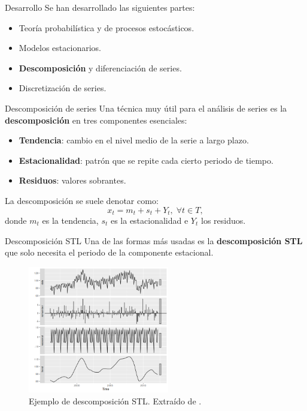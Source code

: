 \documentclass[spanish]{beamer}
\begin{document}
\begin{frame}{Desarrollo}
  Se han desarrollado las siguientes partes:
  \begin{itemize}
    \item Teoría probabilística y de procesos estocásticos.
    \item Modelos estacionarios.
    \item \textbf{Descomposición} y diferenciación de series.
    \item Discretización de series.
  \end{itemize}
\end{frame}

\begin{frame}{Descomposición de series}
  Una técnica muy útil para el análisis de series es la \textbf{descomposición} en tres componentes esenciales:
  \pause
  \begin{itemize}[<+->]
    \item \textbf{Tendencia}: cambio en el nivel medio de la serie a largo plazo.
    \item \textbf{Estacionalidad}: patrón que se repite cada cierto periodo de tiempo.
    \item \textbf{Residuos}: valores sobrantes.
  \end{itemize}
  \pause[\thebeamerpauses]
  La descomposición se suele denotar como: $$x_t = m_t + s_t + Y_t, \; \forall t \in T,$$
  donde $m_t$ es la tendencia, $s_t$ es la estacionalidad e $Y_t$ los residuos.
\end{frame}

\begin{frame}{Descomposición STL}
  Una de las formas más usadas es la \textbf{descomposición STL} que solo necesita el periodo de la componente estacional.

  \begin{figure}
    \centering
    \includegraphics[width=0.55\textwidth]{img/stl-decomposition}
    \caption{Ejemplo de descomposición STL. Extraído de \cite{timeseries}.}
  \end{figure}
\end{frame}
\end{document}
